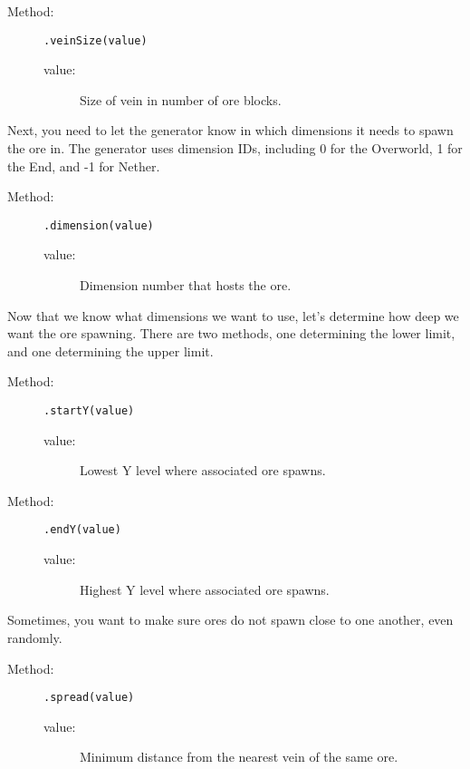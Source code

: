 \documentclass[letterpaper,titlepage,12pt]{article}
\begin{document}
\begin{description}
\begin{description}
\item[Method:] \texttt{.veinSize(value)}
\begin{description}
\item [value:] Size of vein in number of ore blocks.
\end{description}
\end{description}

Next, you need to let the generator know in which dimensions it needs to spawn the ore in.  The generator uses dimension IDs, including 0 for the Overworld, 1 for the End, and -1 for Nether.

\begin{description}
\item[Method:] \texttt{.dimension(value)}
\begin{description}
\item [value:] Dimension number that hosts the ore.
\end{description}
\end{description}

Now that we know what dimensions we want to use, let's determine how deep we want the ore spawning.  There are two methods, one determining the lower limit, and one determining the upper limit.

\begin{description}
\item[Method:] \texttt{.startY(value)}
\begin{description}
\item [value:] Lowest Y level where associated ore spawns.
\end{description}
\end{description}

\begin{description}
\item[Method:] \texttt{.endY(value)}
\begin{description}
\item [value:] Highest Y level where associated ore spawns.
\end{description}
\end{description}

Sometimes, you want to make sure ores do not spawn close to one another, even randomly.

\begin{description}
\item[Method:] \texttt{.spread(value)}
\begin{description}
\item [value:] Minimum distance from the nearest vein of the same ore.
\end{description}
\end{description}


\end{description}
\end{document}
